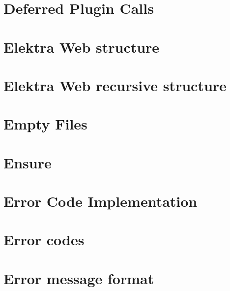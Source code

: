 \let\mypdfximage\pdfximage\def\pdfximage{\immediate\mypdfximage}\documentclass[twoside]{book}
\newcommand{\+}{\discretionary{\mbox{\scriptsize$\hookleftarrow$}}{}{}}
\begin{document}
\chapter{Deferred Plugin Calls}
\label{doc_decisions_6_implemented_deferred_plugin_calls_md}

\chapter{Elektra Web structure}
\label{doc_decisions_6_implemented_elektra_web_md}

\chapter{Elektra Web recursive structure}
\label{doc_decisions_6_implemented_elektra_web_recursive_md}

\chapter{Empty Files}
\label{doc_decisions_6_implemented_empty_files_md}

\chapter{Ensure}
\label{doc_decisions_6_implemented_ensure_md}

\chapter{Error Code Implementation}
\label{doc_decisions_6_implemented_error_code_implementation_md}

\chapter{Error codes}
\label{doc_decisions_6_implemented_error_codes_md}

\chapter{Error message format}
\label{doc_decisions_6_implemented_error_message_format_md}

\end{document}
